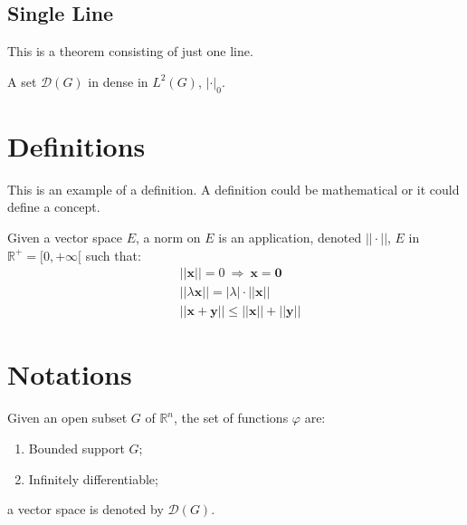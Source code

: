 \documentclass[11pt,fleqn]{book} %
\begin{document}
\subsection{Single Line}
This is a theorem consisting of just one line.

\begin{theorem}
A set $\mathcal{D}(G)$ in dense in $L^2(G)$, $|\cdot|_0$. 
\end{theorem}


\section{Definitions}

This is an example of a definition. A definition could be mathematical or it could define a concept.

\begin{definition}
Given a vector space $E$, a norm on $E$ is an application, denoted $||\cdot||$, $E$ in $\mathbb{R}^+=[0,+\infty[$ such that:
\begin{align}
& ||\mathbf{x}||=0\ \Rightarrow\ \mathbf{x}=\mathbf{0}\\
& ||\lambda \mathbf{x}||=|\lambda|\cdot ||\mathbf{x}||\\
& ||\mathbf{x}+\mathbf{y}||\leq ||\mathbf{x}||+||\mathbf{y}||
\end{align}
\end{definition}


\section{Notations}

\begin{notation}
Given an open subset $G$ of $\mathbb{R}^n$, the set of functions $\varphi$ are:
\begin{enumerate}
\item Bounded support $G$;
\item Infinitely differentiable;
\end{enumerate}
a vector space is denoted by $\mathcal{D}(G)$. 
\end{notation}

\end{document}
